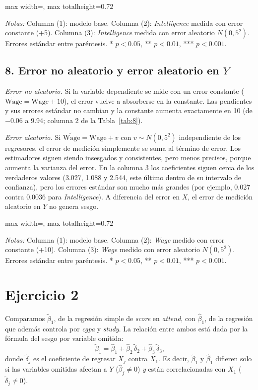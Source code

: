 \documentclass[11pt,a4paper]{article}
\newcommand{\tabla}[1]{\begin{adjustbox}{max width=\linewidth, max totalheight=0.72\textheight}\end{adjustbox}}
\newcommand{\notas}[1]{\par\vspace{0.3em}\begin{minipage}{0.92\linewidth}\footnotesize\textit{Notas:} #1\end{minipage}}
\begin{document}
\begin{table}[H]\centering
\caption{Error no aleatorio y error aleatorio en el regresor}\label{tab:7}
\tabla{"../output/Tabla 7.tex"}
\notas{Columna (1): modelo base. Columna (2): \textit{Intelligence} medida con error constante (+5). Columna (3): \textit{Intelligence} medida con error aleatorio $N(0,5^2)$. Errores estándar entre paréntesis. * $p<0.05$, ** $p<0.01$, *** $p<0.001$.}
\end{table}

\subsection*{8. Error no aleatorio y error aleatorio en $Y$}

\textit{Error no aleatorio.} Si la variable dependiente se mide con un error constante ($\widetilde{\text{Wage}}=\text{Wage}+10$), el error vuelve a absorberse en la constante. Las pendientes y sus errores estándar no cambian y la constante aumenta exactamente en 10 (de $-0.06$ a 9.94; columna 2 de la Tabla~\ref{tab:8}).

\textit{Error aleatorio.} Si $\widetilde{\text{Wage}}=\text{Wage}+v$ con $v\sim N(0,5^2)$ independiente de los regresores, el error de medición simplemente se suma al término de error. Los estimadores siguen siendo insesgados y consistentes, pero menos precisos, porque aumenta la varianza del error. En la columna 3 los coeficientes siguen cerca de los verdaderos valores (3.027, 1.088 y 2.544, este último dentro de su intervalo de confianza), pero los errores estándar son mucho más grandes (por ejemplo, 0.027 contra 0.0036 para \textit{Intelligence}). A diferencia del error en $X$, el error de medición aleatorio en $Y$ no genera sesgo.

\begin{table}[H]\centering
\caption{Error no aleatorio y error aleatorio en la variable dependiente}\label{tab:8}
\tabla{"../output/Tabla 8.tex"}
\notas{Columna (1): modelo base. Columna (2): \textit{Wage} medido con error constante (+10). Columna (3): \textit{Wage} medido con error aleatorio $N(0,5^2)$. Errores estándar entre paréntesis. * $p<0.05$, ** $p<0.01$, *** $p<0.001$.}
\end{table}

\section*{Ejercicio 2}

Comparamos $\tilde\beta_1$, de la regresión simple de \textit{score} en \textit{attend}, con $\hat\beta_1$, de la regresión que además controla por \textit{cgpa} y \textit{study}. La relación entre ambos está dada por la fórmula del sesgo por variable omitida:
\[
\tilde\beta_1=\hat\beta_1+\hat\beta_2\,\tilde\delta_2+\hat\beta_3\,\tilde\delta_3,
\]
donde $\tilde\delta_j$ es el coeficiente de regresar $X_j$ contra $X_1$. Es decir, $\tilde\beta_1$ y $\hat\beta_1$ difieren solo si las variables omitidas afectan a $Y$ ($\hat\beta_j\neq0$) \emph{y} están correlacionadas con $X_1$ ($\tilde\delta_j\neq0$).
\end{document}
